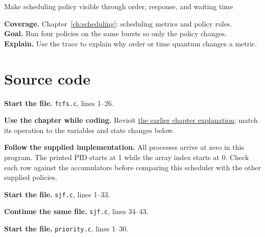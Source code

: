 \begin{labproject}{Make scheduling policy visible through order, response, and waiting time}

\textbf{Coverage.} Chapter~\ref{ch:scheduling}: scheduling metrics and policy rules.\\
\textbf{Goal.} Run four policies on the same bursts so only the policy changes.\\
\textbf{Explain.} Use the trace to explain why order or time quantum changes a metric.




\section*{Source code}
\noindent\textbf{Start the file.} \texttt{fcfs.c}, lines 1--26.



\textbf{Use the chapter while coding.} Revisit \hyperref[ch:scheduling]{the earlier chapter explanation}; match its operation to the variables and state changes below.

\textbf{Follow the supplied implementation.} All processes arrive at zero in this program. The printed PID starts at 1 while the array index starts at 0. Check each row against the accumulators before comparing this scheduler with the other supplied policies.




\noindent\textbf{Start the file.} \texttt{sjf.c}, lines 1--33.


\noindent\textbf{Continue the same file.} \texttt{sjf.c}, lines 34--43.


\noindent\textbf{Start the file.} \texttt{priority.c}, lines 1--30.



\end{labproject}
